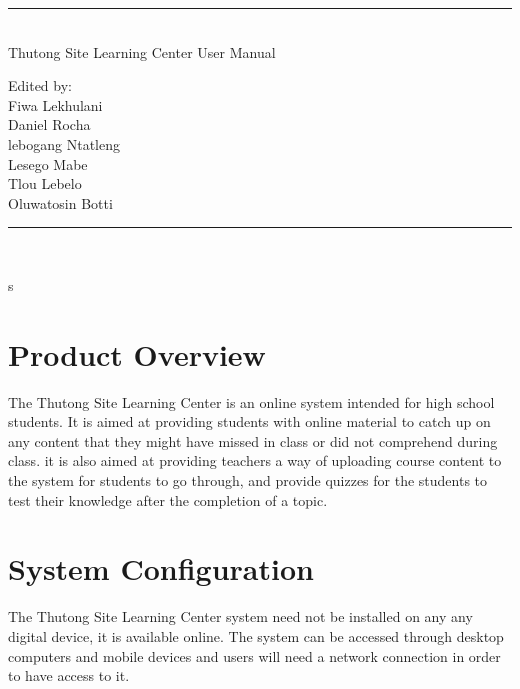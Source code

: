 \documentclass[12pt,a4paper]{article}
\begin{document}
	\begin{titlepage}
		\centering
		\vspace*{\fill}
		
		\vspace*{0.5cm}
		
		\huge\bfseries
		\rule{\textwidth}{1.6pt}\\[\baselineskip]
		Thutong Site Learning Center User Manual
		
		\vspace*{0.5cm}
		
		\large Edited by: \\[\baselineskip]
		
			{Fiwa Lekhulani\\Daniel Rocha\\lebogang Ntatleng\\Lesego Mabe\\Tlou Lebelo\\Oluwatosin Botti}
		
		\rule{\textwidth}{1.6pt}\\[\baselineskip]
		
		
		\vspace*{\fill}
	\end{titlepage}


	\date{\textbf{\today}}
	\pagebreak
	\tableofcontents
	\newpage

s

	\section{Product Overview}
		The Thutong Site Learning Center is an online system intended for high school students. It is aimed at providing students with online material to catch up on any content that they might have missed in class or did not comprehend during class. it is also aimed at providing teachers a way of uploading course content to the system for students to go through, and provide quizzes for the students to test their knowledge after the completion of a topic. 
	
	\section{System Configuration}
		The Thutong Site Learning Center system need not be installed on any any digital device, it is available online. The system can be accessed through desktop computers and mobile devices and users will need a network connection in order to have access to it. 
		
\end{document}
